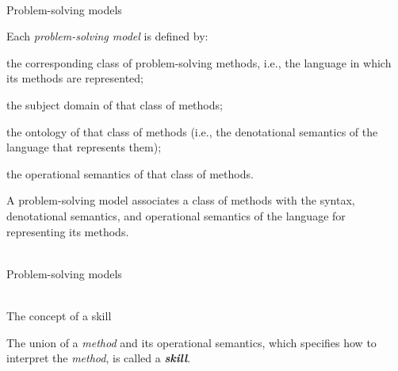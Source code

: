 \begin{frame}{\\Problem-solving models}
	\topline
	\justifying
    \vspace{0.33cm}

    Each \textit{problem-solving model} is defined by:
    \begin{textitemize}
        \item the corresponding class of problem-solving methods, i.e., the language in which its methods are represented;
        \item the subject domain of that class of methods;
        \item the ontology of that class of methods (i.e., the denotational semantics of the language that represents them);
        \item the operational semantics of that class of methods.
    \end{textitemize}
    A problem-solving model associates a class of methods with the syntax, denotational semantics, and operational semantics of the language for representing its methods.
\end{frame}

\begin{frame}{\\Problem-solving models}
	\topline
	\justifying
    \begin{SCn}
    \end{SCn}
\end{frame}

\begin{frame}{\\The concept of a skill}
	\topline
	\justifying

	The union of a \textit{method} and its operational semantics, which specifies how to interpret the \textit{method}, is called a \textbf{\textit{skill}}.

    \begin{SCn}
    \end{SCn}
\end{frame}

